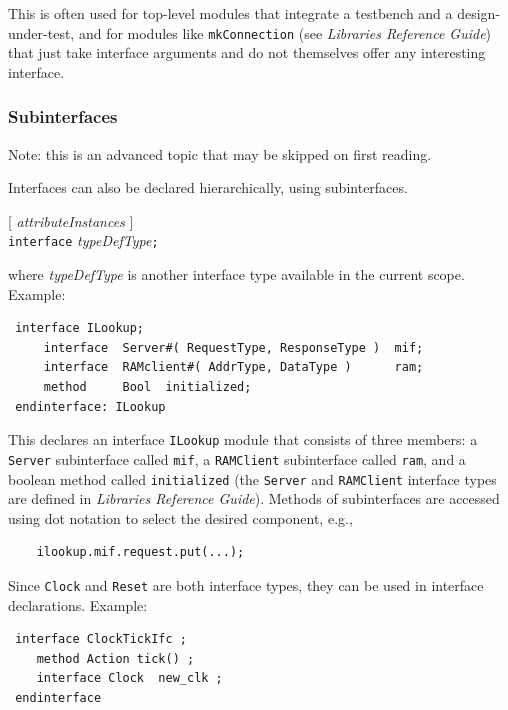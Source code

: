 \documentclass[twoside,letterpaper]{article}
\newcommand{\hm}{\hspace*{1em}}
\newcommand{\LibRefGuide}{\emph{Libraries Reference Guide}}
\newcommand{\nterm}[1]{\emph{#1}}
\newcommand{\term}[1]{\texttt{#1}}
\newcommand{\opt}[1]{[ #1 ]}
\newcommand{\gram}[2]{    \hm\makebox[10em][l]{\it #1}\makebox[1.5em][l]{::=}    #2}
\newcommand{\grammore}[1]{\hm\makebox[10em][l]{      }\makebox[1.5em][l]{}       #1}
\begin{document}
This is often used for top-level modules that integrate a testbench
and a design-under-test, and for modules like \texttt{mkConnection}
(see \LibRefGuide) that just take interface arguments and do not
themselves offer any interesting interface.


\subsubsection{Subinterfaces}

\label{sec-subinterfaces}


Note: this is an advanced topic that may be skipped on first reading.

Interfaces can also be declared hierarchically, using subinterfaces.

\gram{subinterfaceDecl}{ \opt{ \nterm{attributeInstances} } }\\
\grammore               { \term{interface} \nterm{typeDefType}\term{;} }

where \nterm{typeDefType} is another interface type available in the current
scope.  Example:
\begin{verbatim}
 interface ILookup;
     interface  Server#( RequestType, ResponseType )  mif;
     interface  RAMclient#( AddrType, DataType )      ram;
     method     Bool  initialized;
 endinterface: ILookup
\end{verbatim}

This declares an interface \texttt{ILookup} module that consists of
three members: a \texttt{Server} subinterface called \texttt{mif}, a
{\tt RAMClient} subinterface called \texttt{ram}, and a boolean method
called \texttt{initialized} (the \texttt{Server} and
\texttt{RAMClient} interface types are defined in \LibRefGuide).
Methods of subinterfaces are accessed using dot notation to select the
desired component, e.g.,

\begin{verbatim}
    ilookup.mif.request.put(...);
\end{verbatim}

Since \texttt{Clock} and \texttt{Reset} are both interface types, they
can be used in interface declarations.  Example:
\begin{verbatim}
 interface ClockTickIfc ;
    method Action tick() ;
    interface Clock  new_clk ;
 endinterface
\end{verbatim}
\end{document}
